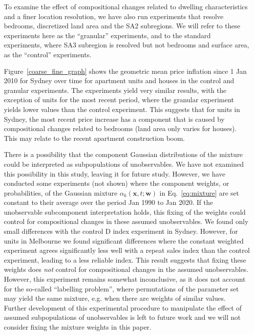 To examine the effect of compositional changes related to dwelling characteristics and a finer location resolution, we have also run experiments that resolve bedrooms, discretized land area and the SA2 subregions. We will refer to these experiments here as the ``granular'' experiments, and to the standard experiments, where SA3 subregion is resolved but not bedrooms and surface area, as the ``control'' experiments. 


Figure~\ref{coarse_fine_graph} shows the geometric mean price inflation since 1 Jan 2010 for Sydney over time for apartment units and houses in the control and granular experiments. The experiments yield very similar results, with the exception of units for the most recent period, where the granular experiment yields lower values than the control experiment. This suggests that for units in Sydney, the most recent price increase has a component that is caused by compositional changes related to bedrooms (land area only varies for houses). This may relate to the recent apartment construction boom. 


There is a possibility that the component Gaussian distributions of the mixture could be interpreted as subpopulations of unobservables. We have not examined this possibility in this study, leaving it for future study. However, we have conducted some experiments (not shown) where the component weights, or probabilities, of the Gaussian mixture $\alpha_k (\mathbf{x}, t;\mathbf{w})$ in Eq.~\ref{eq:mixture} are set constant to their average over the period Jan 1990 to Jan 2020. If the unobservable subcomponent interpretation holds, this fixing of the weights could control for compositional changes in these assumed unobservables. We found only small differences with the control D index experiment in Sydney. However, for units in Melbourne we found significant differences where the constant weighted experiment agrees significantly less well with a repeat sales index than the control experiment, leading to a less reliable index. This result suggests that fixing these weights does \emph{not} control for compositional changes in the assumed unobservables. However, this experiment remains somewhat inconclusive, as it does not account for the so-called ``labelling problem'', where permutations of the parameter set may yield the same mixture, e.g. when there are weights of similar values. Further development of this experimental procedure to manipulate the effect of assumed subpopulations of unobservables is left to future work and we will not consider fixing the mixture weights in this paper.


